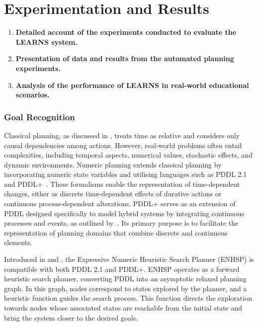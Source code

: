 \section{Experimentation and Results}
\begin{enumerate}
    \item \textbf{Detailed account of the experiments conducted to evaluate the LEARNS system.}
    \item \textbf{Presentation of data and results from the automated planning experiments.}
    \item \textbf{Analysis of the performance of LEARNS in real-world educational scenarios.}
\end{enumerate}

\subsubsection{Goal Recognition}
Classical planning, as discussed in \citet{Fox2003}, treats time as relative and considers only causal dependencies among actions. However, real-world problems often entail complexities, including temporal aspects, numerical values, stochastic effects, and dynamic environments. Numeric planning extends classical planning by incorporating numeric state variables and utilising languages such as PDDL 2.1~\cite{Fox2003} and PDDL+~\cite{Fox2006}. These formalisms enable the representation of time-dependent changes, either as discrete time-dependent effects of durative actions or continuous process-dependent alterations. PDDL+ serves as an extension of PDDL designed specifically to model hybrid systems by integrating continuous processes and events, as outlined by~\citet{Haslum2019}. Its primary purpose is to facilitate the representation of planning domains that combine discrete and continuous elements.

Introduced in \citet{Scala2016} and \citet{ScalaHaslum2016}, the Expressive Numeric Heuristic Search Planner (ENHSP) is compatible with both PDDL 2.1 and PDDL+. ENHSP operates as a forward heuristic search planner, converting PDDL into an asymptotic relaxed planning graph. In this graph, nodes correspond to states explored by the planner, and a heuristic function guides the search process. This function directs the exploration towards nodes whose associated states are reachable from the initial state and bring the system closer to the desired goals.

